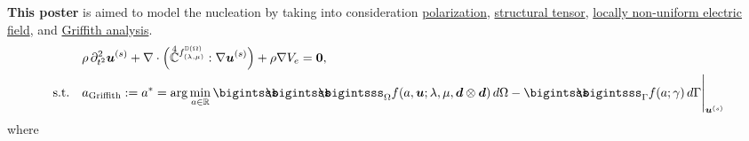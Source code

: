 \documentclass[25pt, a0paper,
portrait,
margin=5mm, innermargin=5mm, blockverticalspace=15mm, colspace=15mm, subcolspace=0mm]{tikzposter}
\newcommand{\newcaption}[2]{\parbox{#1}{\centering{\small \it #2\par}}\normalsize}
\begin{document}
\begin{columns}
{		\textbf{This poster} is aimed to model the nucleation
		by taking into consideration
		\underline{polarization}, \underline{structural tensor}, 
		\underline{locally non-uniform electric field}, and 
		\underline{Griffith analysis}. 
		\begin{align}
			 & \rho\,
			\partial^2_{t^2}
			\bm{u}^{(s)}
			+
			\nabla \cdot
			\Big(
			\accentset{\scriptstyle 4}{\mathbb{C}}^{f^{\mathbb{D}(\Omega)}_{(\lambda,\mu)}}
			:\nabla\Bu^{(s)}
			\Big)
			+
			\rho\nabla V_{e}
			= \textbf{0},                                                                                                                                                                                                                                                               \\
			\text{s.t.}\quad 
			 & a_{\text{Griffith}} := a^{*} = \arg\min_{a\in\mathbb{R}}{\bigintsss\!\!\!\!\!\!\bigintsss\!\!\!\!\!\!\bigintsss_{\Omega} f(a,\bm{u};\lambda,\mu,\bm{d}\otimes\bm{d}) \, d\Omega - \bigintsss\!\!\!\!\!\!\bigintsss_{\Gamma} f(a;\gamma) \, d\Gamma}\Bigg|_{\bm{u}^{(s)}}
		\end{align}
		where
		
}
\end{columns}
\end{document}
